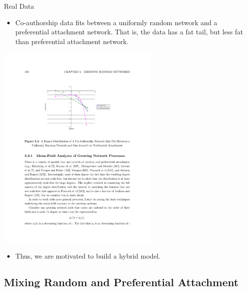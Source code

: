 \documentclass{beamer}
\begin{document}
\begin{frame}{Real Data}
	\begin{itemize}
		\item
			Co-authorship data fits between a uniformly random network and a preferential attachment network.
			That is, the data has a fat tail, but less fat than preferential attachment network.
	\end{itemize}
	\begin{center}
		\includegraphics[width=0.6\textwidth]{figures/coauthor_data.pdf}
	\end{center}
	\begin{itemize}
		\item
			Thus, we are motivated to build a hybrid model.
	\end{itemize}
\end{frame}

\subsection*{Mixing Random and Preferential Attachment}
\end{document}
